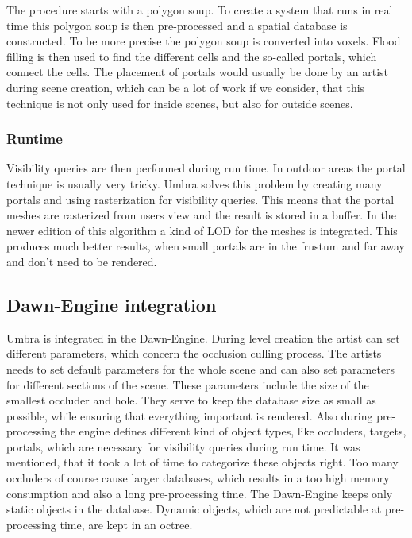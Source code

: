\documentclass[a4paper]{article}
\begin{document}
The procedure starts with a polygon soup. To create a system that runs in real 
time this polygon soup is then pre-processed and a spatial database is constructed.
To be more precise the polygon soup is converted into voxels. Flood filling is then 
used to find the different cells and the so-called portals, which connect the cells.
The placement of portals would usually be done by an artist during scene creation, which can be a lot of work if we consider, that this technique is not only used for inside scenes, but also for outside scenes.

\subsubsection{Runtime}

Visibility queries are then performed during run time. In outdoor areas the portal 
technique is usually very tricky. Umbra solves this problem by creating many portals
and using rasterization for visibility queries. This means that the portal meshes are rasterized from users view and the result is stored in a buffer. 
In the newer edition of this algorithm a kind of LOD for the meshes is integrated. This produces much better results, when small portals are in the frustum and far away and don't need to be rendered.

\subsection{Dawn-Engine integration}
Umbra is integrated in the Dawn-Engine. During level creation the artist can set different parameters, which concern the occlusion culling process. The artists needs to set default parameters for the whole scene and can also set parameters for different sections of the scene. These parameters include the size of the smallest occluder and hole. They serve to keep the database size as small as possible, while ensuring that everything important is rendered. \newline
Also during pre-processing the engine defines different kind of object types, like occluders, targets, portals, which are necessary for visibility queries during run time. 
It was mentioned, that it took a lot of time to categorize these objects right. Too many occluders of course cause larger databases, which results in a too high memory consumption and also a long pre-processing time.\newline
The Dawn-Engine keeps only static objects in the database. Dynamic objects, which are not predictable at pre-processing time, are kept in an octree.
\end{document}
